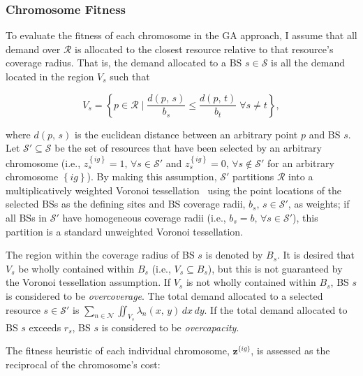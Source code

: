 \documentclass[12pt,dvipsnames]{report}
\begin{document}
\subsubsection{Chromosome Fitness}

To evaluate the fitness of each chromosome in the GA approach, I assume that all demand over $\mathcal{R}$ is allocated to the closest resource relative to that resource's coverage radius.  That is, the demand allocated to a BS $s \in \mathcal{S}$ is all the demand located in the region $V_s$ such that

\begin{equation}
	V_s = \left\{ p \in \mathcal{R} \mid \frac{d \left( p,\, s \right)}{b_s} \leq \frac{d \left( p,\, t \right)}{b_t} \; \forall s \neq t \right\},
\end{equation}

\noindent where $d \left( p,\, s \right)$ is the euclidean distance between an arbitrary point $p$ and BS $s$.  Let $\mathcal{S}' \subseteq \mathcal{S}$ be the set of resources that have been selected by an arbitrary chromosome (i.e., $z_s^{\left\{ ig \right\}} = 1,\, \forall s \in \mathcal{S}'$ and $z_s^{\left\{ ig \right\}} = 0,\, \forall s \not\in \mathcal{S}'$ for an arbitrary chromosome $\left\{ ig \right\}$).  By making this assumption, $\mathcal{S}'$ partitions $\mathcal{R}$ into a multiplicatively weighted Voronoi tessellation~\cite{Dobrin_areview,AURENHAMMER1984251} using the point locations of the selected BSs as the defining sites and BS coverage radii, $b_s,\, s \in \mathcal{S}'$, as weights; if all BSs in $\mathcal{S}'$ have homogeneous coverage radii (i.e., $b_s = b,\, \forall s \in \mathcal{S}'$), this partition is a standard unweighted Voronoi tessellation.

The region within the coverage radius of BS $s$ is denoted by $B_s$.  It is desired that $V_s$ be wholly contained within $B_s$ (i.e., $V_s \subseteq B_s$), but this is not guaranteed by the Voronoi tessellation assumption.  If $V_s$ is not wholly contained within $B_s$, BS $s$ is considered to be \emph{overcoverage}.  The total demand allocated to a selected resource $s \in \mathcal{S}'$ is $\sum_{n \in \mathcal{N}} \iint_{V_s} \lambda_n \left( x,\, y \right) \,dx \,dy$.  If the total demand allocated to BS $s$ exceeds $r_s$, BS $s$ is considered to be \emph{overcapacity}.

The fitness heuristic of each individual chromosome, $\textbf{z}^{\{ig\}}$, is assessed as the reciprocal of the chromosome's cost:
\end{document}
